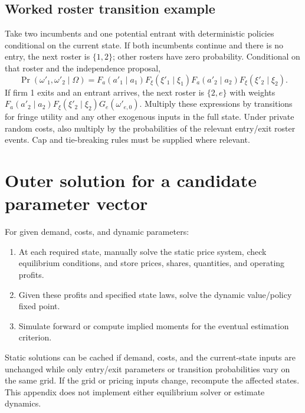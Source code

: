 \documentclass[11pt]{article}
\begin{document}
\subsection*{Worked roster transition example}
Take two incumbents and one potential entrant with deterministic policies conditional on the current state. If both incumbents continue and there is no entry, the next roster is $\{1,2\}$; other rosters have zero probability. Conditional on that roster and the independence proposal,
\[
\Pr(\omega'_1,\omega'_2\mid\Omega)=F_a(a'_1\mid a_1)F_\xi(\xi'_1\mid\xi_1)F_a(a'_2\mid a_2)F_\xi(\xi'_2\mid\xi_2).
\]
If firm 1 exits and an entrant arrives, the next roster is $\{2,e\}$ with weights $F_a(a'_2\mid a_2)F_\xi(\xi'_2\mid\xi_2)G_e(\omega'_{e,0})$. Multiply these expressions by transitions for fringe utility and any other exogenous inputs in the full state. Under private random costs, also multiply by the probabilities of the relevant entry/exit roster events. Cap and tie-breaking rules must be supplied where relevant.

\section{Outer solution for a candidate parameter vector}
For given demand, costs, and dynamic parameters:
\begin{enumerate}
\item At each required state, manually solve the static price system, check equilibrium conditions, and store prices, shares, quantities, and operating profits.
\item Given these profits and specified state laws, solve the dynamic value/policy fixed point.
\item Simulate forward or compute implied moments for the eventual estimation criterion.
\end{enumerate}
Static solutions can be cached if demand, costs, and the current-state inputs are unchanged while only entry/exit parameters or transition probabilities vary on the same grid. If the grid or pricing inputs change, recompute the affected states. This appendix does not implement either equilibrium solver or estimate dynamics.

\clearpage
\end{document}

